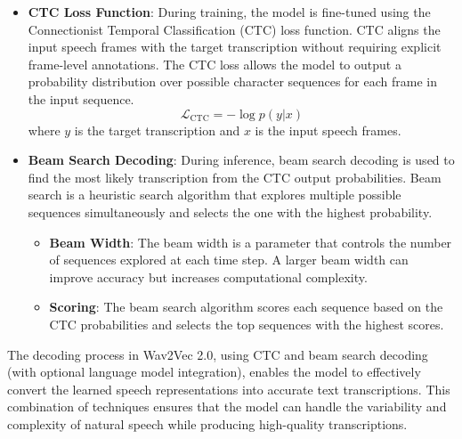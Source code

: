 \documentclass{article}
\begin{document}
\begin{itemize}

  \item \textbf{CTC Loss Function}: During training, the model is fine-tuned using the Connectionist Temporal Classification (CTC) loss function. CTC aligns the input speech frames with the target transcription without requiring explicit frame-level annotations. The CTC loss allows the model to output a probability distribution over possible character sequences for each frame in the input sequence.
  \[
  \mathcal{L}_{\text{CTC}} = -\log p(y | x)
  \]
  where \( y \) is the target transcription and \( x \) is the input speech frames.

  \item \textbf{Beam Search Decoding}: During inference, beam search decoding is used to find the most likely transcription from the CTC output probabilities. Beam search is a heuristic search algorithm that explores multiple possible sequences simultaneously and selects the one with the highest probability.
  \begin{itemize}
    \item \textbf{Beam Width}: The beam width is a parameter that controls the number of sequences explored at each time step. A larger beam width can improve accuracy but increases computational complexity.
    \item \textbf{Scoring}: The beam search algorithm scores each sequence based on the CTC probabilities and selects the top sequences with the highest scores.
  \end{itemize}

\end{itemize}

The decoding process in Wav2Vec 2.0, using CTC and beam search decoding (with optional language model integration), enables the model to effectively convert the learned speech representations into accurate text transcriptions. This combination of techniques ensures that the model can handle the variability and complexity of natural speech while producing high-quality transcriptions.


\pagebreak
\end{document}
